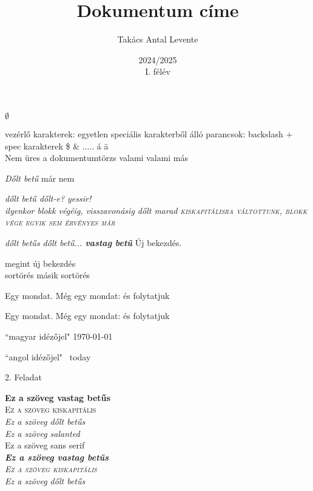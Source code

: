 \documentclass{article}
\begin{document}
\title{Dokumentum címe} %
\author{Takács Antal Levente}
\date{2024/2025\\I. félév}

\maketitle 

$\emptyset$ %

vezérlő karakterek: egyetlen speciális karakterből álló parancsok:
backslash + spec karakterek
\$ \& ..... \'a \"a \H \\
Nem üres a dokumentumtörzs
		valami
	valami más

\textit{Dőlt betű} már nem%

{\itshape{dőlt betű} dőlt-e? yessir!
\\
ilyenkor blokk végéig, visszavonásig dőlt marad
\scshape kiskapitálisra váltottunk, blokk vége egyik sem érvényes már
}\par
\textit{dőlt betűs dőlt betű...
\textbf{vastag betű} }
Új bekezdés.\par 
megint új bekezdés\\
sortörés\newline
másik sortörés

Egy mondat. Még egy mondat: és folytatjuk

\frenchspacing
Egy mondat. Még egy mondat: és folytatjuk

``magyar idézőjel" %
\today %

``angol idézőjel" \ today

\begin{center}
{\Huge 2. Feladat}
\end{center}
\textbf{Ez a szöveg vastag betűs}\\
\textsc {Ez a szöveg kiskapitális}\\
\textit{Ez a szöveg dőlt betűs}\\
\textsl{Ez a szöveg salanted}\\
\textsf{Ez a szöveg sans serif}\\
\emph{\textbf{Ez a szöveg vastag betűs}}\\
\emph{\scshape {Ez a szöveg kiskapitális}}\\
\emph{\textit{Ez a szöveg dőlt betűs}}\\
\end{document}
